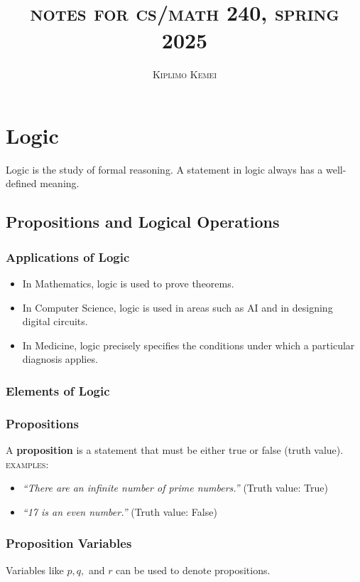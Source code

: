 \documentclass{article}
\title{\textsc{notes for cs/math 240, spring 2025}}
\author{\textsc{Kiplimo Kemei}}
\begin{document}
\maketitle

\section{Logic}
Logic is the study of formal reasoning. A statement in logic always has a well-defined meaning.

\subsection{Propositions and Logical Operations}
\subsubsection{Applications of Logic}
\begin{itemize}
    \item In Mathematics, logic is used to prove theorems.
    \item In Computer Science, logic is used in areas such as AI and in designing digital circuits.
    \item In Medicine, logic precisely specifies the conditions under which a particular diagnosis applies.
\end{itemize}

\subsubsection{Elements of Logic}

\subsubsection*{Propositions}
A \textbf{proposition} is a statement that must be either true or false (truth value). \\

\textsc{examples:}
\begin{itemize}
    \item \textit{``There are an infinite number of prime numbers.''} \quad (Truth value: True)
    \item \textit{``17 is an even number.''} \quad (Truth value: False)
\end{itemize}

\subsubsection*{Proposition Variables}
Variables like $p, q,$ and $r$ can be used to denote propositions. \\
\end{document}
